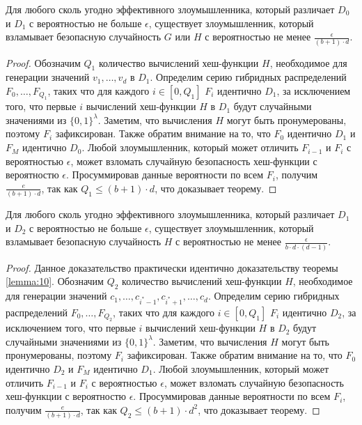\begin{theorem}
	\label{lemma:10}
	Для любого сколь угодно эффективного злоумышленника, который различает $D_0$ и $D_1$ с вероятностью не больше $\epsilon$, существует злоумышленник, который взламывает безопасную случайность $G$ или $H$ с вероятностью не менее $\frac{\epsilon}{(b + 1) \cdot d}$.
\end{theorem}

\begin{proof}
	Обозначим $Q_1$ количество вычислений хеш-функции $H$, необходимое для генерации значений $v_1, \dots, v_d$ в $D_1$.
	Определим серию гибридных распределений $F_0, \dots, F_{Q_1}$, таких что для каждого $i \in [0, Q_1]$ $F_i$ идентично $D_1$, за исключением того, что первые $i$ вычислений хеш-функции $H$ в $D_1$ будут случайными значениями из $\{0, 1\}^\lambda$.
	Заметим, что вычисления $H$ могут быть пронумерованы, поэтому $F_i$ зафиксирован.
	Также обратим внимание на то, что $F_0$ идентично $D_1$ и $F_M$ идентично $D_0$.
	Любой злоумышленник, который может отличить $F_{i - 1}$ и $F_{i}$ с вероятностью $\epsilon$, может взломать случайную безопасность хеш-функции с вероятностю $\epsilon$.
	Просуммировав данные вероятности по всем $F_i$, получим $\frac{e}{(b + 1) \cdot d}$, так как $Q_1 \leq (b + 1) \cdot d$, что доказывает теорему.
\end{proof}

\begin{theorem}
	\label{lemma:11}
	Для любого сколь угодно эффективного злоумышленника, который различает $D_1$ и $D_2$ с вероятностью не больше $\epsilon$, существует злоумышленник, который взламывает безопасную случайность $H$ с вероятностью не менее $\frac{\epsilon}{b \cdot d \cdot (d - 1)}$.
\end{theorem}

\begin{proof}
	Данное доказательство практически идентично доказательству теоремы \ref{lemma:10}.
	Обозначим $Q_2$ количество вычислений хеш-функции $H$, необходимое для генерации значений $c_1, \dots, c_{i^* - 1}, c_{i^* + 1}, \dots, c_d$.
	Определим серию гибридных распределений $F_0, \dots, F_{Q_2}$, таких что для каждого $i \in [0, Q_1]$ $F_i$ идентично $D_2$, за исключением того, что первые $i$ вычислений хеш-функции $H$ в $D_2$ будут случайными значениями из $\{0, 1\}^\lambda$.
	Заметим, что вычисления $H$ могут быть пронумерованы, поэтому $F_i$ зафиксирован.
	Также обратим внимание на то, что $F_0$ идентично $D_2$ и $F_M$ идентично $D_1$.
	Любой злоумышленник, который может отличить $F_{i - 1}$ и $F_{i}$ с вероятностью $\epsilon$, может взломать случайную безопасность хеш-функции с вероятностю $\epsilon$.
	Просуммировав данные вероятности по всем $F_i$, получим $\frac{e}{(b + 1) \cdot d}$, так как $Q_2 \leq (b + 1) \cdot d^2$, что доказывает теорему.
\end{proof}


